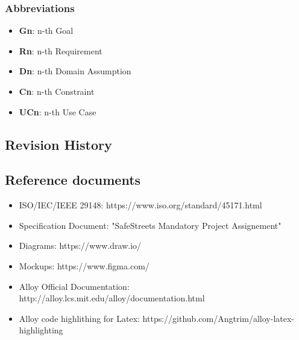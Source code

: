 \documentclass{article}
\begin{document}
\subsubsection{Abbreviations}
\begin{itemize}
    \item \textbf{Gn}: n-th Goal
    \item \textbf{Rn}: n-th Requirement 
    \item \textbf{Dn}: n-th Domain Assumption
    \item \textbf{Cn}: n-th Constraint 
    \item \textbf{UCn}: n-th Use Case
\end{itemize}

\subsection{Revision History}

\subsection{Reference documents}
\begin{itemize}
    \item ISO/IEC/IEEE 29148: https://www.iso.org/standard/45171.html
    \item Specification Document: "SafeStreets Mandatory Project Assignement"
    \item Diagrams: https://www.draw.io/
    \item Mockups: https://www.figma.com/
    \item Alloy Official Documentation: http://alloy.lcs.mit.edu/alloy/documentation.html
    \item Alloy code highlithing for Latex: https://github.com/Angtrim/alloy-latex-highlighting
\end{itemize}
\end{document}
